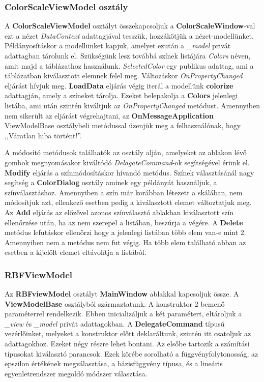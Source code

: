 			\subsubsection{ColorScaleViewModel osztály}
			
				A \textbf{ColorScaleViewModel} osztályt összekapcsoljuk a \textbf{ColorScaleWindow}-val ezt a nézet \textit{DataContext} adattagjával tesszük, hozzákötjük a nézet-modellünket. Példányosításkor a modellünket kapjuk, amelyet ezután a \textit{\_model} privát adattagban tárolunk el. Szükségünk lesz továbbá színek listájára \textit{Colors} néven, amit majd a táblázathoz használunk. \textit{SelectedColor} egy publikus adattag, ami a táblázatban kiválasztott elemnek felel meg. Változáskor \textit{OnPropertyChanged} eljárást hívjuk meg. \textbf{LoadData} eljárás végig iterál a modellünk \textbf{colorize} adattagján, amely a színeket tárolja. Ezeket belepakolja a \textbf{Colors} jelenlegi listába, ami után szintén kiváltjuk az \textit{OnPropertyChanged} metódust. Amennyiben nem sikerült az eljárást végrehajtani, az \textbf{OnMessageApplication} ViewModelBase osztálybeli metódussal üzenjük meg a felhasználónak, hogy ,,Váratlan hiba történt!''. 
				
				A módosító metódusok találhatók az osztály alján, amelyeket az ablakon lévő gombok megnyomásakor kiváltódó \textit{DelagateCommand}-ok segítségével érünk el. \textbf{Modify} eljárás a színmódosításkor hívandó metódus. Színek választásánál nagy segítség a \textbf{ColorDialog} osztály aminek egy példányát használjuk, a színválasztáshoz. Amennyiben a szín már korábban létezett a skálában, nem módosítjuk azt, ellenkező esetben pedig a kiválasztott elemet változtatjuk meg. Az \textbf{Add} eljárás az előzővel azonos színválasztó ablakban kiválasztott szín ellenőrzése után, ha az nem szerepel a listában, beszúrja a végére. A \textbf{Delete} metódus lefutáskor ellenőrzi hogy a jelenlegi listában több elem van-e mint $2$. Amennyiben nem a metódus nem fut végig. Ha több elem található abban az esetben a kijelölt elemet eltávolítja a listából.
			
			\subsubsection{RBFViewModel}
			
				Az \textbf{RBFviewModel} osztályt \textbf{MainWindow} ablakkal kapcsoljuk össze. A \textbf{ViewModelBase} osztályból származtatunk. A konstruktor 2 bemenő paraméterrel rendelkezik. Ebben inicializáljuk a két paramétert, eltároljuk a \textit{\_view} és \textit{\_model} privát adattagokban. A \textbf{DelegateCommand} típusú vezérlőinket, melyeket a konstruktor előtt deklaráltunk, szintén itt csatoljuk az adattagokhoz. Ezeket négy részre lehet bontani. Az elsőbe tartozik a számítási típusokat kiválasztó parancsok. Ezek körébe sorolható a függvényfolytonosság, az epszilon értékének megválasztása, a bázisfüggvény típusa, és a lineáris egyenletrendszer megoldó módszer választása. 
				
